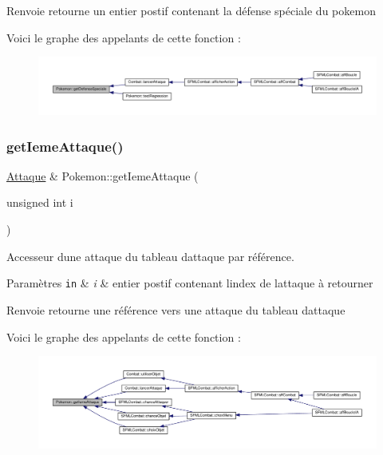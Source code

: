 \begin{DoxyReturn}{Renvoie}
retourne un entier postif contenant la défense spéciale du pokemon 
\end{DoxyReturn}
Voici le graphe des appelants de cette fonction \+:\nopagebreak
\begin{figure}[H]
\begin{center}
\leavevmode
\includegraphics[width=350pt]{class_pokemon_a5f932295f014353aeead20e0225b6eee_icgraph}
\end{center}
\end{figure}
\mbox{\label{class_pokemon_aad16e1f997ee22fe4f0ec385c5bdbc55}} 
\subsubsection{\texorpdfstring{get\+Ieme\+Attaque()}{getIemeAttaque()}}
{\footnotesize\ttfamily \hyperlink{class_attaque}{Attaque} \& Pokemon\+::get\+Ieme\+Attaque (\begin{DoxyParamCaption}\item[{unsigned int}]{i }\end{DoxyParamCaption})}



Accesseur d\textquotesingle{}une attaque du tableau d\textquotesingle{}attaque par référence. 


\begin{DoxyParams}[1]{Paramètres}
\mbox{\tt in}  & {\em i} & entier postif contenant l\textquotesingle{}index de l\textquotesingle{}attaque à retourner \\
\hline
\end{DoxyParams}
\begin{DoxyReturn}{Renvoie}
retourne une référence vers une attaque du tableau d\textquotesingle{}attaque 
\end{DoxyReturn}
Voici le graphe des appelants de cette fonction \+:\nopagebreak
\begin{figure}[H]
\begin{center}
\leavevmode
\includegraphics[width=350pt]{class_pokemon_aad16e1f997ee22fe4f0ec385c5bdbc55_icgraph}
\end{center}
\end{figure}
\mbox{\label{class_pokemon_a5688276dbf96174ceccec44d416f2df6}} 
